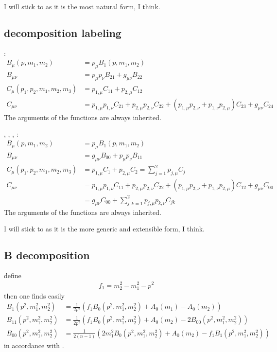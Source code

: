 \documentclass[
  english,		%
  a4paper,		%
  11pt,			%
  DIV=12,		%
  titlepage,
  toc=bibnumbered,
  parskip=full,  	%
  headings=normal,
  BCOR=12mm,
  numbers=noenddot
]{scrartcl}
\begin{document}
I will stick to \cite{Bojak:2000eu} as it is the most natural form, I think.

\subsection{decomposition labeling}
\cite{Passarino:1978jh,Bojak:2000eu}:
\begin{align}
B_\mu(p,m_1,m_2) &=p_{\mu} B_1(p,m_1,m_2)\\
B_{\mu\nu} &= p_{\mu}p_{\nu} B_{21}+g_{\mu\nu}B_{22}\\
C_{\mu}(p_1,p_2,m_1,m_2,m_3) &= p_{1,\mu}C_{11}+p_{2,\mu}C_{12}\\
C_{\mu\nu} &= p_{1,\mu}p_{1,\nu}C_{21}+p_{2,\mu}p_{2,\nu}C_{22}+(p_{1,\mu}p_{2,\nu}+p_{1,\nu}p_{2,\mu})C_{23}+g_{\mu\nu}C_{24}
\end{align}
The arguments of the functions are always inherited.

\HEPMath, \FeynCalc, \LoopTools, \cite{Ellis:2011cr}:
\begin{align}
B_\mu(p,m_1,m_2) &=p_{\mu} B_1(p,m_1,m_2)\\
B_{\mu\nu} &= g_{\mu\nu}B_{00}+p_{\mu}p_{\nu} B_{11}\\
C_{\mu}(p_1,p_2,m_1,m_2,m_3) &= p_{1,\mu}C_{1}+p_{2,\mu}C_{2}=\sum_{j=1}^2 p_{j,\mu}C_{j}\\
C_{\mu\nu} &= p_{1,\mu}p_{1,\nu}C_{11}+p_{2,\mu}p_{2,\nu}C_{22}+(p_{1,\mu}p_{2,\nu}+p_{1,\nu}p_{2,\mu})C_{12}+g_{\mu\nu}C_{00}\\
 &=g_{\mu\nu}C_{00} + \sum_{j,k=1}^2 p_{j,\mu}p_{k,\nu}C_{jk}
\end{align}
The arguments of the functions are always inherited.

I will stick to \HEPMath{} as it is the more generic and extensible form, I think.

\subsection{B decomposition}
define
\begin{align}
f_1 = m_2^2-m_1^2-p^2
\end{align}
then one finds easily
\begin{align}
B_1(p^2,m_1^2,m_2^2) &= \frac 1 {2p^2}\left(f_1B_0(p^2,m_1^2,m_2^2)+A_0(m_1)-A_0(m_2)\right) \label{eq:B1}\\
B_{11}(p^2,m_1^2,m_2^2) &= \frac 1 {2p^2}\left(f_1B_0(p^2,m_1^2,m_2^2)+A_0(m_2)-2B_{00}(p^2,m_1^2,m_2^2)\right)\\
B_{00}(p^2,m_1^2,m_2^2) &= \frac 1 {2(n-1)}\left(2m_1^2B_0(p^2,m_1^2,m_2^2)+A_0(m_2)-f_1B_1(p^2,m_1^2,m_2^2)\right)
\end{align}
in accordance with \cite{Bojak:2000eu,Ellis:2011cr}.
\end{document}
